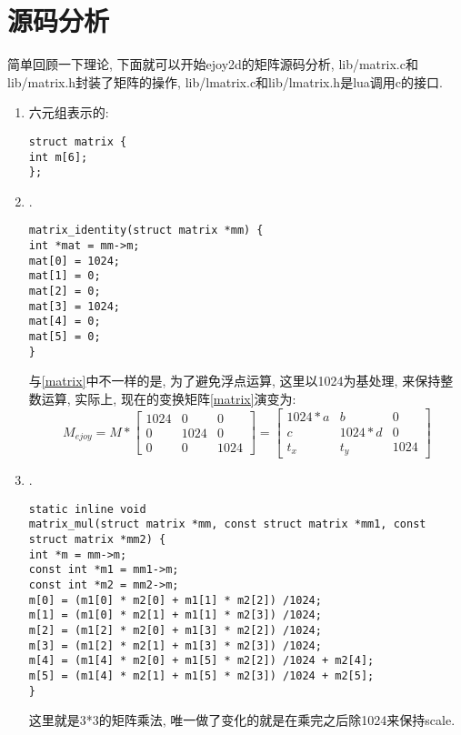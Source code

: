 \section {\Large \ZHH 源码分析} {

    { 简单回顾一下理论, 下面就可以开始ejoy2d的矩阵源码分析, lib/matrix.c和lib/matrix.h封装了矩阵的操作, lib/lmatrix.c和lib/lmatrix.h是lua调用c的接口.}

    \begin {enumerate}

    \gaccobsplitinv

    \item { 六元组表示的{}:
\begin{lstlisting}[language={[ANSI]C}]
struct matrix {
int m[6];
};
\end{lstlisting}
    }

    \gaccobsplitinv

    \item { {}.
\begin{lstlisting}[language={[ANSI]C}]
matrix_identity(struct matrix *mm) {
int *mat = mm->m;
mat[0] = 1024;
mat[1] = 0;
mat[2] = 0;
mat[3] = 1024;
mat[4] = 0;
mat[5] = 0;
}
\end{lstlisting}
        与\eqref{matrix}中不一样的是, 为了避免浮点运算, 这里以1024为基处理, 来保持整数运算, 实际上, 现在的变换矩阵\eqref{matrix}演变为:
        \begin{equation}\label{matrix_ejoy2d}
            M_{ejoy} =
            M *
            \begin{bmatrix}
                1024    &   0       &   0\\
                0       &   1024    &   0\\
                0       &   0       &   1024
            \end{bmatrix}
            =
            \begin{bmatrix}
                1024 * a    &   b           & 0 \\
                c           &   1024 * d    & 0 \\
                t_x         &   t_y         & 1024
            \end{bmatrix}
        \end{equation}
    }

    \gaccobsplitinv

    \item { {}.
\begin{lstlisting}[language={[ANSI]C}]
static inline void
matrix_mul(struct matrix *mm, const struct matrix *mm1, const struct matrix *mm2) {
int *m = mm->m;
const int *m1 = mm1->m;
const int *m2 = mm2->m;
m[0] = (m1[0] * m2[0] + m1[1] * m2[2]) /1024;
m[1] = (m1[0] * m2[1] + m1[1] * m2[3]) /1024;
m[2] = (m1[2] * m2[0] + m1[3] * m2[2]) /1024;
m[3] = (m1[2] * m2[1] + m1[3] * m2[3]) /1024;
m[4] = (m1[4] * m2[0] + m1[5] * m2[2]) /1024 + m2[4];
m[5] = (m1[4] * m2[1] + m1[5] * m2[3]) /1024 + m2[5];
}
\end{lstlisting}
        这里就是3*3的矩阵乘法, 唯一做了变化的就是在乘完之后除1024来保持scale.
    }


\end{enumerate}}
